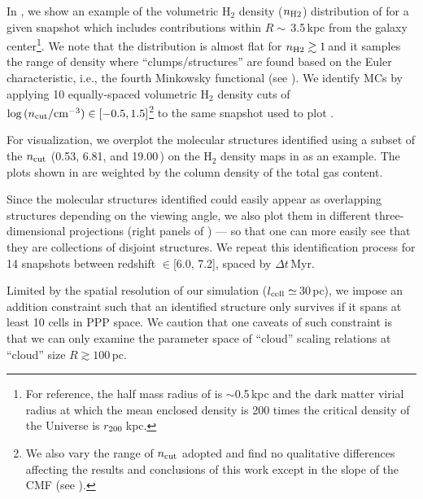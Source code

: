 \IfFileExists{emulateapjlegacy.cls}{\documentclass[iop]{emulateapjlegacy}}{\documentclass[iop]{emulateapj}}
\begin{document}
In , we show an example of the volumetric H$_2$ density ($n_{\rm H2}$) distribution of \flower
for a given snapshot which includes contributions within $R\sim$\,3.5\,kpc from the galaxy center\footnote{For reference,
the half mass radius of \flower is $\sim$0.5\,kpc and the dark matter virial radius at which the mean enclosed density is 200 times
the critical density of the Universe %
is $r_{\rm 200}$\,kpc.}.
We note that the distribution is almost flat for $n_{\rm H2}\gtrsim1$\,\cc and it samples the range of density
where ``clumps/structures'' are
found based on the Euler characteristic, i.e., the fourth Minkowsky functional (see \citealt{Pallottini17b}).
We identify MCs by applying 10 equally-spaced volumetric H$_2$ density cuts of
$\log{(n_{\rm cut}/{\rm cm^{-3})}}\in[-0.5, 1.5]$\eq[0.32, 0.53, 0.88, 1.45, 2.45, 4.08, 6.81, 11.36, 19.00, 31.62]\footnote{We also vary the range of
$n_{\rm cut}$ adopted and find no qualitative differences
affecting the results and conclusions of this work except in the slope of the CMF (see ).}
to the same snapshot
used to plot .

For visualization, we overplot the molecular structures identified using
a subset of the $n_{\rm cut}$ (0.53, 6.81, and 19.00\,\cc) on the H$_2$ density maps
in  as an example.
The plots shown in  are weighted by the column density of the total gas content.

Since the molecular structures identified could
easily appear as overlapping structures depending on the viewing angle, we
also plot them in different three-dimensional projections (right panels of ) --- so that one can more
easily see that they are collections of disjoint structures.
We repeat this identification process for 14 snapshots between
redshift \z$\in$[6.0, 7.2], spaced by $\Delta t$\,Myr.


Limited by the spatial resolution of our simulation ($l_{\rm cell}\simeq$\,30\,pc), we impose an addition constraint such that an identified structure only survives if it spans at least 10 cells in PPP space. We caution that one caveats of such constraint is that we can only examine the parameter space of ``cloud'' scaling relations at ``cloud'' size $R\gtrsim100$\,pc.
\end{document}
